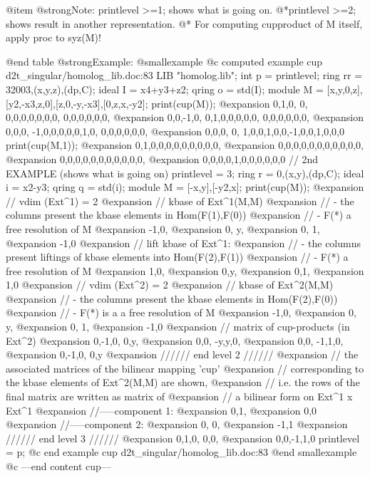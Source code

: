 @item @strong{Note:}
printlevel >=1; shows what is going on.
@*printlevel >=2; shows result in another representation.
@* For computing cupproduct of M itself, apply proc to syz(M)!

@end table
@strong{Example:}
@smallexample
@c computed example cup d2t_singular/homolog_lib.doc:83 
LIB "homolog.lib";
int p      = printlevel;
ring  rr   = 32003,(x,y,z),(dp,C);
ideal  I   = x4+y3+z2;
qring  o   = std(I);
module M   = [x,y,0,z],[y2,-x3,z,0],[z,0,-y,-x3],[0,z,x,-y2];
print(cup(M));
@expansion{} 0,1,0, 0, 0,0,0,0,0,0,0, 0,0,0,0,0,0,
@expansion{} 0,0,-1,0, 0,1,0,0,0,0,0, 0,0,0,0,0,0,
@expansion{} 0,0,0, -1,0,0,0,0,0,1,0, 0,0,0,0,0,0,
@expansion{} 0,0,0, 0, 1,0,0,1,0,0,-1,0,0,1,0,0,0 
print(cup(M,1));
@expansion{} 0,1,0,0,0,0,0,0,0,0,0,
@expansion{} 0,0,0,0,0,0,0,0,0,0,0,
@expansion{} 0,0,0,0,0,0,0,0,0,0,0,
@expansion{} 0,0,0,0,1,0,0,0,0,0,0 
// 2nd EXAMPLE  (shows what is going on)
printlevel = 3;
ring   r   = 0,(x,y),(dp,C);
ideal  i   = x2-y3;
qring  q   = std(i);
module M   = [-x,y],[-y2,x];
print(cup(M));
@expansion{} // vdim (Ext^1) = 2
@expansion{} // kbase of Ext^1(M,M)
@expansion{} //  - the columns present the kbase elements in Hom(F(1),F(0))
@expansion{} //  - F(*) a free resolution of M
@expansion{} -1,0,
@expansion{} 0, y,
@expansion{} 0, 1,
@expansion{} -1,0 
@expansion{} // lift kbase of Ext^1:
@expansion{} //  - the columns present liftings of kbase elements into Hom(F(2),F(1))
@expansion{} //  - F(*) a free resolution of M 
@expansion{} 1,0,
@expansion{} 0,y,
@expansion{} 0,1,
@expansion{} 1,0 
@expansion{} // vdim (Ext^2) = 2
@expansion{} // kbase of Ext^2(M,M)
@expansion{} //  - the columns present the kbase elements in Hom(F(2),F(0))
@expansion{} //  - F(*) is a a free resolution of M 
@expansion{} -1,0,
@expansion{} 0, y,
@expansion{} 0, 1,
@expansion{} -1,0 
@expansion{} // matrix of cup-products (in Ext^2)
@expansion{} 0,-1,0, 0,y,
@expansion{} 0,0, -y,y,0,
@expansion{} 0,0, -1,1,0,
@expansion{} 0,-1,0, 0,y 
@expansion{} ////// end level 2 //////
@expansion{} // the associated matrices of the bilinear mapping 'cup' 
@expansion{} // corresponding to the kbase elements of Ext^2(M,M) are shown,
@expansion{} //  i.e. the rows of the final matrix are written as matrix of
@expansion{} //  a bilinear form on Ext^1 x Ext^1
@expansion{} //-----component 1:
@expansion{} 0,1,
@expansion{} 0,0 
@expansion{} //-----component 2:
@expansion{} 0, 0,
@expansion{} -1,1 
@expansion{} ////// end level 3 //////
@expansion{} 0,1,0, 0,0,
@expansion{} 0,0,-1,1,0 
printlevel = p;
@c end example cup d2t_singular/homolog_lib.doc:83
@end smallexample
@c ---end content cup---

